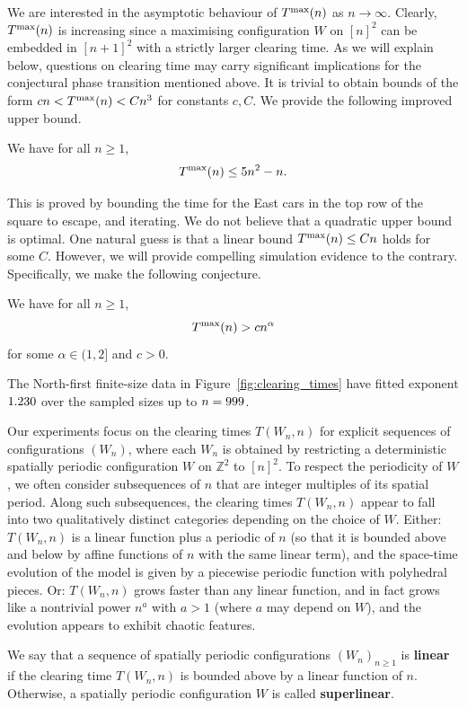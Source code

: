 \documentclass[reqno]{amsart}
\begin{document}
We are interested in the asymptotic behaviour of $T^{\text{\rm max}}(n)$ as $n\to\infty$. Clearly, $T^{\text{\rm max}}(n)$ is increasing since a maximising configuration $W$ on $[n]^2$ can be embedded in $[n+1]^2$ with a strictly larger clearing time.   As we will explain below, questions on clearing time may carry significant implications for the conjectural phase transition mentioned above. It is trivial to obtain bounds of the form $cn <T^{\text{\rm max}}(n) < C n^3$ for constants $c,C$. We provide the following improved upper bound.
\begin{theorem} \label{thm:upper_bound} We have for all $n\geq 1$,
\[ T^{\text{\rm max}}(n) \leq 5 n^2-n. \]
\end{theorem}
This is proved by bounding the time for the East cars in the top row of the square to escape, and iterating.  We do not believe that a quadratic upper bound is optimal. One natural guess is that a linear bound $T^{\text{\rm max}}(n) \leq C n$ holds for some $C$.  However, we will provide compelling simulation evidence to the contrary.  Specifically, we make the following conjecture.
\begin{conjecture} We have for all $n\geq 1$,
	\[ T^{\text{\rm max}}(n) > c n^\alpha \]
	for some $\alpha \in (1,2]$ and $c > 0$.
\end{conjecture}
The North-first finite-size data in Figure~\ref{fig:clearing_times} have fitted exponent $1.230$ over the sampled sizes up to $n=999$.

Our experiments focus on the clearing times $ T(W_n, n) $ for explicit sequences of configurations $ (W_n) $, where each $ W_n $ is obtained by restricting a deterministic spatially periodic configuration $ W $ on $ \mathbb{Z}^2 $ to $ [n]^2 $. To respect the periodicity of $ W $, we often consider subsequences of $ n $ that are integer multiples of its spatial period. Along such subsequences, the clearing times $ T(W_n, n) $ appear to fall into two qualitatively distinct categories depending on the choice of $ W $. Either: $ T(W_n, n) $ is a linear function plus a periodic of $n$ (so that it is bounded above and below by affine functions of $ n $ with the same linear term), and the space-time evolution of the model is given by a piecewise periodic function with polyhedral pieces. Or: $ T(W_n, n) $ grows faster than any linear function, and in fact grows like a nontrivial power $ n^a $ with $a>1$ (where $a$ may depend on $W$), and the evolution appears to exhibit chaotic features.

We say that a sequence of spatially periodic configurations $ (W_n)_{n\geq 1} $ is \textbf{linear} if the clearing time $ T(W_n, n) $ is bounded above by a linear function of $ n $.  Otherwise, a spatially periodic configuration $ W $ is called \textbf{superlinear}.
\end{document}
